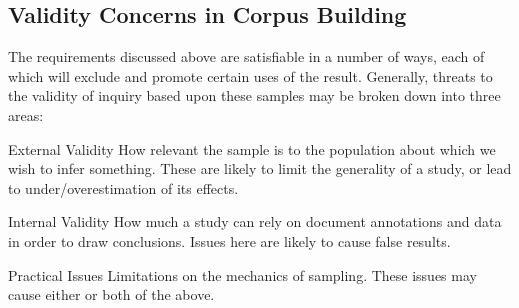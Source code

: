 % 
% 
% 
% 
% 












\subsection{Validity Concerns in Corpus Building}




The requirements discussed above are satisfiable in a number of ways, each of which will exclude and promote certain uses of the result.  Generally, threats to the validity of inquiry based upon these samples may be broken down into three areas:

\begin{itemizeTitle}
    \item[External Validity] How relevant the sample is to the population about which we wish to infer something.  These are likely to limit the generality of a study, or lead to under/overestimation of its effects.
    \item[Internal Validity] How much a study can rely on document annotations and data in order to draw conclusions.  Issues here are likely to cause false results.
    \item[Practical Issues] Limitations on the mechanics of sampling.  These issues may cause either or both of the above.
\end{itemizeTitle}

